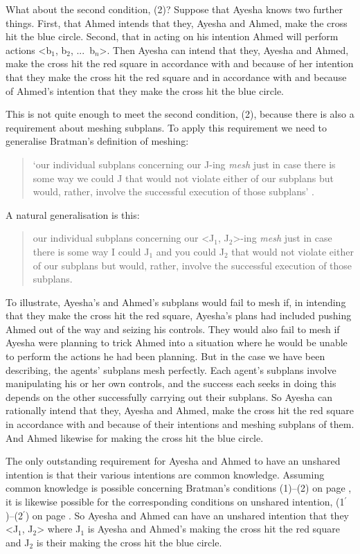 \documentclass[12pt,\papersize]{extarticle}
\begin{document}
What about the second condition, (2)?
Suppose that Ayesha knows two further things.
First, that Ahmed intends that they, Ayesha and Ahmed, make the cross hit the blue circle.
Second, that in acting on his intention Ahmed will perform actions <b$_1$, b$_2$, ...\ b$_n$>.
Then Ayesha can intend that they, Ayesha and Ahmed, make the cross hit the red square in accordance with and because of her intention that they make the cross hit the red square and in accordance with and because of Ahmed's intention that they make the cross hit the blue circle.

This is not quite enough to meet the second condition, (2), because there is also a requirement about meshing subplans. 
To apply this requirement we need to generalise Bratman's definition of meshing:
\begin{quote}
`our individual subplans concerning our J-ing \emph{mesh} just in case there is some way we could J that would not violate either of our subplans but would, rather, involve the successful execution of those subplans' \citep[p.\ 106]{Bratman:1993je}.
\end{quote}
A natural generalisation is this:
\begin{quote}
our individual subplans concerning our <J$_1$, J$_2$>-ing \emph{mesh} just in case there is some way I could J$_1$ and you could J$_2$ that would not violate either of our subplans but would, rather, involve the successful execution of those subplans. 
\end{quote}
%
To illustrate, 
Ayesha's and Ahmed's subplans would fail to mesh if, in intending that they make the cross hit the red square,  Ayesha's plans had included pushing Ahmed out of the way and seizing his controls. 
They would also fail to mesh if Ayesha were planning to trick Ahmed into a situation where he would be unable to perform the actions he had been planning.
But in the case we have been describing, the agents' subplans mesh perfectly.
Each agent's subplans involve manipulating his or her own controls,
and the success each seeks in doing this depends on the other successfully carrying out their subplans.
So Ayesha can rationally intend that they, Ayesha and Ahmed, make the cross hit the red square in accordance with and because of their intentions and meshing subplans of them.
And Ahmed likewise for making the cross hit the blue circle.

The only outstanding requirement for Ayesha and Ahmed to have an unshared intention is that their various intentions are common knowledge. 
Assuming common knowledge is possible concerning Bratman's conditions (1)--(2) on page \pageref{quote:bratman_account}, 
it is likewise possible for the corresponding conditions on unshared intention, (1$^\prime$)--(2$^\prime$) on page  \pageref{df:unshared_intention}.
So Ayesha and Ahmed can have an unshared intention that they <J$_1$, J$_2$> where J$_1$ is Ayesha and Ahmed's making the cross hit the red square and J$_2$ is their making the cross hit the blue circle.
\end{document}
